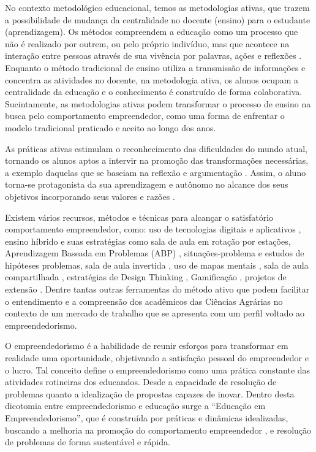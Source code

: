 No contexto metodológico educacional, temos as metodologias ativas, que trazem a possibilidade de mudança da centralidade no docente (ensino) para o estudante (aprendizagem). Os métodos compreendem a educação como um processo que não é realizado por outrem, ou pelo próprio indivíduo, mas que acontece na interação entre pessoas através de sua vivência por palavras, ações e reflexões \cite{paiva_metodologias_2016}. Enquanto o método tradicional de ensino utiliza a transmissão de informações e concentra as atividades no docente, na metodologia ativa, os alunos ocupam a centralidade da educação e o conhecimento é construído de forma colaborativa. Sucintamente, as metodologias ativas podem transformar o processo de ensino na busca pelo comportamento empreendedor, como uma forma de enfrentar o modelo tradicional praticado e aceito ao longo dos anos.
 
As práticas ativas estimulam o reconhecimento das dificuldades do mundo atual, tornando os alunos aptos a intervir na promoção das transformações necessárias, a exemplo daquelas que se baseiam na reflexão e argumentação \cite{bezanilla_methodologies_2019}. Assim, o aluno torna-se protagonista da sua aprendizagem e autônomo no alcance dos seus objetivos incorporando seus valores e razões \cite{rubel_student_2016}.

Existem vários recursos, métodos e técnicas para alcançar o satisfatório comportamento empreendedor, como: uso de tecnologias digitais e aplicativos \cite{pereira_use_2020}, ensino híbrido e suas estratégias como sala de aula em rotação por estações, Aprendizagem Baseada em Problemas (ABP) \cite{souza_aprendizagem_2015}, situações-problema e estudos de hipóteses problemas, sala de aula invertida \cite{junior_sala_2016,branco_sala_2016}, uso de mapas mentais \cite{junior_percepcao_2018}, sala de aula compartilhada \cite{strack_por_2009}, estratégias de Design Thinking \cite{andrews_circular_2015}, Gamificação \cite{ogawa_avaliacao_2016}, projetos de extensão \cite{santos_projeto_2019}. Dentre tantas outras ferramentas do método ativo que podem facilitar o entendimento e a compreensão dos acadêmicos das Ciências Agrárias no contexto de um mercado de trabalho que se apresenta com um perfil voltado ao empreendedorismo.

O empreendedorismo é a habilidade de reunir esforços para transformar em realidade uma oportunidade, objetivando a satisfação pessoal do empreendedor e o lucro. Tal conceito define o empreendedorismo como uma prática constante das atividades rotineiras dos educandos. Desde a capacidade de resolução de problemas quanto a idealização de propostas capazes de inovar. Dentro desta dicotomia entre empreendedorismo e educação surge a “Educação em Empreendedorismo”, que é construída por práticas e dinâmicas idealizadas, buscando a melhoria na promoção do comportamento empreendedor \cite{martins_educacao_2016, morais_empreendedorismo_2018}, e resolução de problemas de forma sustentável e rápida.

